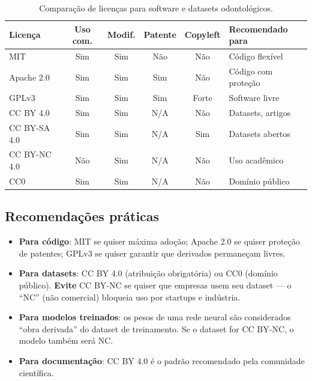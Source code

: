 \begin{table}[H]
  \centering
  \caption{Comparação de licenças para software e datasets odontológicos.}
  \label{tab:licenses-comparison}
  \begin{tabularx}{\textwidth}{lccccX}
    \toprule
    \textbf{Licença} & \textbf{Uso com.} & \textbf{Modif.} & \textbf{Patente} & \textbf{Copyleft} & \textbf{Recomendado para} \\
    \midrule
    MIT & Sim & Sim & Não & Não & Código flexível \\
    Apache 2.0 & Sim & Sim & Sim & Não & Código com proteção \\
    GPLv3 & Sim & Sim & Sim & Forte & Software livre \\
    CC BY 4.0 & Sim & Sim & N/A & Não & Datasets, artigos \\
    CC BY-SA 4.0 & Sim & Sim & N/A & Sim & Datasets abertos \\
    CC BY-NC 4.0 & Não & Sim & N/A & Não & Uso acadêmico \\
    CC0 & Sim & Sim & N/A & Não & Domínio público \\
    \bottomrule
  \end{tabularx}
\end{table}

    

\subsection{Recomendações práticas}

\begin{itemize}
  \item \textbf{Para código}: MIT se quiser máxima adoção; Apache 2.0 se
    quiser proteção de patentes; GPLv3 se quiser garantir que derivados
    permaneçam livres.

  \item \textbf{Para datasets}: CC BY 4.0 (atribuição obrigatória) ou
    CC0 (domínio público). \textbf{Evite} CC BY-NC se quiser que empresas
    usem seu dataset — o ``NC'' (não comercial) bloqueia uso por startups
    e indústria.

  \item \textbf{Para modelos treinados}: os pesos de uma rede neural são
    considerados ``obra derivada'' do dataset de treinamento. Se o dataset
    for CC BY-NC, o modelo também será NC.

  \item \textbf{Para documentação}: CC BY 4.0 é o padrão recomendado pela
    comunidade científica.
\end{itemize}

